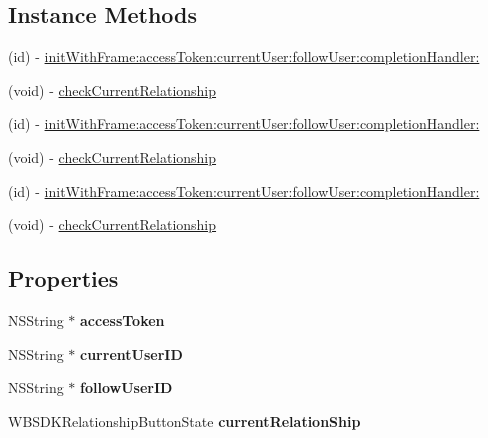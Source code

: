 \subsection*{Instance Methods}
\begin{DoxyCompactItemize}
\item 
(id) -\/ \mbox{\hyperlink{interface_w_b_s_d_k_relationship_button_a85b82fa757539a1509954d90b04c75a6}{init\+With\+Frame\+:access\+Token\+:current\+User\+:follow\+User\+:completion\+Handler\+:}}
\item 
(void) -\/ \mbox{\hyperlink{interface_w_b_s_d_k_relationship_button_aeb1cf530cec4953b9d9def4d51dc9375}{check\+Current\+Relationship}}
\item 
(id) -\/ \mbox{\hyperlink{interface_w_b_s_d_k_relationship_button_a85b82fa757539a1509954d90b04c75a6}{init\+With\+Frame\+:access\+Token\+:current\+User\+:follow\+User\+:completion\+Handler\+:}}
\item 
(void) -\/ \mbox{\hyperlink{interface_w_b_s_d_k_relationship_button_aeb1cf530cec4953b9d9def4d51dc9375}{check\+Current\+Relationship}}
\item 
(id) -\/ \mbox{\hyperlink{interface_w_b_s_d_k_relationship_button_a85b82fa757539a1509954d90b04c75a6}{init\+With\+Frame\+:access\+Token\+:current\+User\+:follow\+User\+:completion\+Handler\+:}}
\item 
(void) -\/ \mbox{\hyperlink{interface_w_b_s_d_k_relationship_button_aeb1cf530cec4953b9d9def4d51dc9375}{check\+Current\+Relationship}}
\end{DoxyCompactItemize}
\subsection*{Properties}
\begin{DoxyCompactItemize}
\item 
\mbox{\label{interface_w_b_s_d_k_relationship_button_a275df6eafbb090c2319ed59d68324d76}} 
N\+S\+String $\ast$ {\bfseries access\+Token}
\item 
\mbox{\label{interface_w_b_s_d_k_relationship_button_aadfa5a189683d02baba7f80823b25e53}} 
N\+S\+String $\ast$ {\bfseries current\+User\+ID}
\item 
\mbox{\label{interface_w_b_s_d_k_relationship_button_a0c77d00b64dfbc1c9ef34b0bc8b2ac91}} 
N\+S\+String $\ast$ {\bfseries follow\+User\+ID}
\item 
\mbox{\label{interface_w_b_s_d_k_relationship_button_a64d84890b8638ada7ad9dff2c234d597}} 
W\+B\+S\+D\+K\+Relationship\+Button\+State {\bfseries current\+Relation\+Ship}
\end{DoxyCompactItemize}


